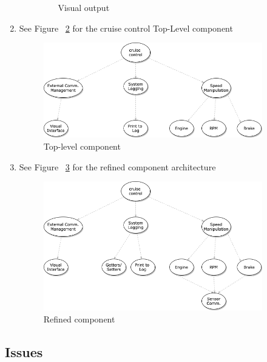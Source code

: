 \documentclass[preprint,11pt,3p]{article}
\begin{document}
\begin{enumerate}
\begin{enumerate}
\begin{figure}[H]
					\caption{Visual output}
					\label{fig:visual}
				\end{figure}
		\end{enumerate}
	\item See Figure ~\ref{fig:top} for the cruise control Top-Level component
		\begin{figure}[H]
			\includegraphics[width=0.9\textwidth]{images/architecture_top_level.png}
			\caption{Top-level component}
			\label{fig:top}
		\end{figure}
	\item See Figure ~\ref{fig:refined} for the refined component architecture
		\begin{figure}[H]
			\includegraphics[width=0.9\textwidth]{images/architecture_refined_component.png}
			\caption{Refined component}
			\label{fig:refined}
		\end{figure}
\end{enumerate}

\subsection{Issues}
\end{document}
